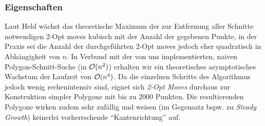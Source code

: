   \subsubsection{Eigenschaften}

    Laut Held wächst das theoretische Maximum der zur Entfernung aller Schnitte
    notwendigen 2-Opt moves kubisch mit der Anzahl der gegebenen Punkte, in der
    Praxis sei die Anzahl der durchgeführten 2-Opt moves jedoch eher quadratisch
    in Abhängigkeit von $n$. In Verbund mit der von uns implementierten, naiven
    Polygon-Schnitt-Suche (in $\mathcal{O}(n^2)$) erhalten wir ein theoretisches
    asymptotisches Wachstum der Laufzeit von $\mathcal{O}(n^4)$. Da die einzelnen
    Schritte des Algorithmus jedoch wenig rechenintensiv sind, eignet sich
    \emph{2-Opt Moves} durchaus zur Konstruktion simpler Polygone mit bis zu
    2000 Punkten. Die resultierenden Polygone wirken zudem sehr zufällig und
    weisen (im Gegensatz bspw. zu \emph{Steady Growth}) keinerlei vorherrschende
    \enquote{Kantenrichtung} auf.
    